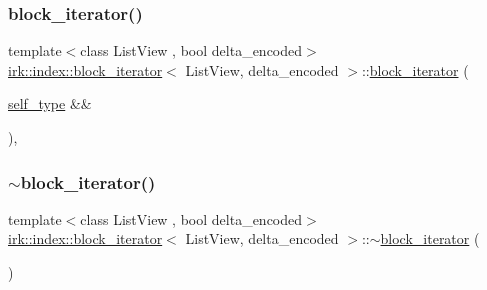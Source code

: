 \subsubsection{\texorpdfstring{block\+\_\+iterator()}{block\_iterator()}\hspace{0.1cm}{\footnotesize\ttfamily [2/3]}}
{\footnotesize\ttfamily template$<$class List\+View , bool delta\+\_\+encoded$>$ \\
\mbox{\hyperlink{classirk_1_1index_1_1block__iterator}{irk\+::index\+::block\+\_\+iterator}}$<$ List\+View, delta\+\_\+encoded $>$\+::\mbox{\hyperlink{classirk_1_1index_1_1block__iterator}{block\+\_\+iterator}} (\begin{DoxyParamCaption}\item[{\mbox{\hyperlink{classirk_1_1index_1_1block__iterator_a338ee8fee726492e9f8bbad4b4d75766}{self\+\_\+type}} \&\&}]{ }\end{DoxyParamCaption})\hspace{0.3cm}{\ttfamily [default]}, {\ttfamily [noexcept]}}

\mbox{\label{classirk_1_1index_1_1block__iterator_a6fd6578325dd4bcc585accac5782bf74}} 
\subsubsection{\texorpdfstring{$\sim$block\+\_\+iterator()}{~block\_iterator()}}
{\footnotesize\ttfamily template$<$class List\+View , bool delta\+\_\+encoded$>$ \\
\mbox{\hyperlink{classirk_1_1index_1_1block__iterator}{irk\+::index\+::block\+\_\+iterator}}$<$ List\+View, delta\+\_\+encoded $>$\+::$\sim$\mbox{\hyperlink{classirk_1_1index_1_1block__iterator}{block\+\_\+iterator}} (\begin{DoxyParamCaption}{ }\end{DoxyParamCaption})\hspace{0.3cm}{\ttfamily [default]}}

\mbox{\label{classirk_1_1index_1_1block__iterator_ad68e07c02a8233cb098a23d57abf0e01}} 
